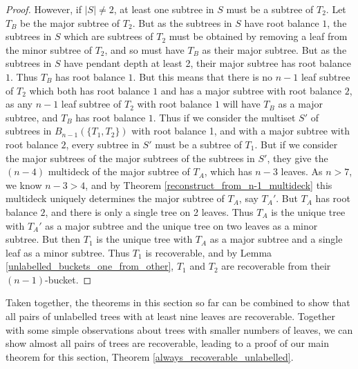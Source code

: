 \documentclass[12pt]{article}
\theoremstyle{definition}
\begin{document}
\begin{proof}
    However, if $|S| \neq 2$, at least one subtree in $S$ must be a subtree of $T_2$. Let $T_B$ be the major subtree of $T_2$. But as the subtrees in $S$ have root balance $1$, the subtrees in $S$ which are subtrees of $T_2$ must be obtained by removing a leaf from the minor subtree of $T_2$, and so must have $T_B$ as their major subtree. But as the subtrees in $S$ have pendant depth at least 2, their major subtree has root balance $1$. Thus $T_B$ has root balance $1$. But this means that there is no $n-1$ leaf subtree of $T_2$ which both has root balance $1$ and has a major subtree with root balance $2$, as any $n-1$ leaf subtree of $T_2$ with root balance $1$ will have $T_B$ as a major subtree, and $T_B$ has root balance $1$. Thus if we consider the multiset $S'$ of subtrees in $B_{n-1}(\{T_1, T_2\})$ with root balance 1, and with a major subtree with root balance $2$, every subtree in $S'$ must be a subtree of $T_1$. But if we consider the major subtrees of the major subtrees of the subtrees in $S'$, they give the $(n-4)$ multideck of the major subtree of $T_A$, which has $n-3$ leaves. As $n > 7$, we know $n-3>4$, and by Theorem \ref{reconstruct_from_n-1_multideck} this multideck uniquely determines the major subtree of $T_A$, say $T_A'$. But $T_A$ has root balance $2$, and there is only a single tree on 2 leaves. Thus $T_A$ is the unique tree with $T_A'$ as a major subtree and the unique tree on two leaves as a minor subtree. But then $T_1$ is the unique tree with $T_A$ as a major subtree and a single leaf as a minor subtree. Thus $T_1$ is recoverable, and by Lemma \ref{unlabelled_buckets_one_from_other}, $T_1$ and $T_2$ are recoverable from their $(n-1)$-bucket.
\end{proof}

Taken together, the theorems in this section so far can be combined to show that all pairs of unlabelled trees with at least nine leaves are recoverable. Together with some simple observations about trees with smaller numbers of leaves, we can show almost all pairs of trees are recoverable, leading to a proof of our main theorem for this section, Theorem \ref{always_recoverable_unlabelled}.
\end{document}
